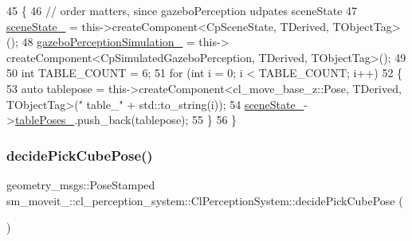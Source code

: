 \begin{DoxyCode}
45             \{
46                 \textcolor{comment}{// order matters, since gazeboPerception udpates sceneState}
47                 \hyperlink{classsm__moveit__4_1_1cl__perception__system_1_1ClPerceptionSystem_a82ea8feeb2fa43349f91ed59137b3890}{sceneState\_} = this->createComponent<CpSceneState, TDerived, TObjectTag>();
48                 \hyperlink{classsm__moveit__4_1_1cl__perception__system_1_1ClPerceptionSystem_a027c07df3f1a2cc0c30be111b27dbe5c}{gazeboPerceptionSimulation\_} = this->
      createComponent<CpSimulatedGazeboPerception, TDerived, TObjectTag>();
49                 
50                 \textcolor{keywordtype}{int} TABLE\_COUNT = 6;
51                 \textcolor{keywordflow}{for} (\textcolor{keywordtype}{int} i = 0; i < TABLE\_COUNT; i++)
52                 \{
53                     \textcolor{keyword}{auto} tablepose = this->createComponent<cl\_move\_base\_z::Pose, TDerived, TObjectTag>(\textcolor{stringliteral}{"
      table\_"} + std::to\_string(i));
54                     \hyperlink{classsm__moveit__4_1_1cl__perception__system_1_1ClPerceptionSystem_a82ea8feeb2fa43349f91ed59137b3890}{sceneState\_}->\hyperlink{classsm__moveit__4_1_1cl__perception__system_1_1CpSceneState_a4becce67e327e0364bcb8c2b796deade}{tablePoses\_}.push\_back(tablepose);
55                 \}
56             \}
\end{DoxyCode}
\mbox{\label{classsm__moveit__4_1_1cl__perception__system_1_1ClPerceptionSystem_ab4abc387e9053b62464a542378d779e5}} 
\subsubsection{\texorpdfstring{decide\+Pick\+Cube\+Pose()}{decidePickCubePose()}}
{\footnotesize\ttfamily geometry\+\_\+msgs\+::\+Pose\+Stamped sm\+\_\+moveit\+\_\+::cl\+\_\+perception\+\_\+system\+::\+Cl\+Perception\+System\+::decide\+Pick\+Cube\+Pose (\begin{DoxyParamCaption}{ }\end{DoxyParamCaption})\hspace{0.3cm}{\ttfamily [inline]}}



